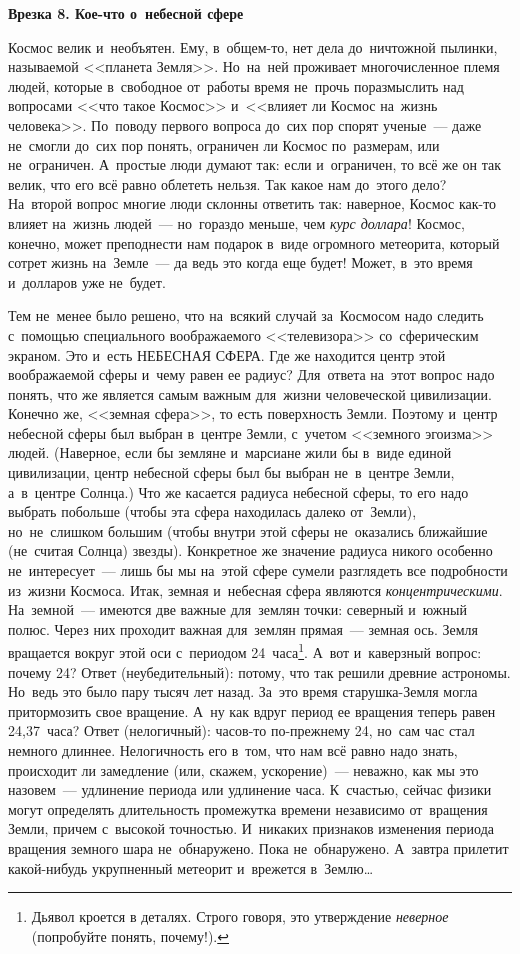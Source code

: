 \textbf{Врезка 8. Кое-что о~небесной сфере}

Космос велик и~необъятен. Ему, в~общем-то, нет дела до~ничтожной пылинки, называемой <<планета
Земля>>. Но~на~ней проживает многочисленное племя людей, которые в~свободное от~работы время
не~прочь поразмыслить над вопросами <<что такое Космос>> и~<<влияет ли Космос на~жизнь человека>>.
По~поводу первого вопроса до~сих пор спорят ученые~--- даже не~смогли до~сих пор понять, ограничен
ли Космос по~размерам, или не~ограничен. А~простые люди думают так: если и~ограничен, то всё же он
так велик, что его всё равно облететь нельзя. Так какое нам до~этого дело? На~второй вопрос многие
люди склонны ответить так: наверное, Космос как-то влияет на~жизнь людей~--- но~гораздо меньше, чем
\textit{курс доллара}! Космос, конечно, может преподнести нам подарок в~виде огромного метеорита, который
сотрет жизнь на~Земле~--- да ведь это когда еще будет! Может, в~это время и~долларов уже не~будет.

Тем не~менее было решено, что на~всякий случай за~Космосом надо следить с~помощью специального
воображаемого <<телевизора>> со~сферическим экраном. Это и~есть НЕБЕСНАЯ СФЕРА. Где же находится
центр этой воображаемой сферы и~чему равен ее радиус? Для~ответа на~этот вопрос надо понять, что же
является самым важным для~жизни человеческой цивилизации. Конечно же, <<земная сфера>>, то есть
поверхность Земли. Поэтому и~центр небесной сферы был выбран в~центре Земли, с~учетом <<земного
эгоизма>> людей. (Наверное, если бы земляне и~марсиане жили бы в~виде единой цивилизации, центр
небесной сферы был бы выбран не~в~центре Земли, а~в~центре Солнца.) Что же касается радиуса
небесной сферы, то его надо выбрать побольше (чтобы эта сфера находилась далеко от~Земли),
но~не~слишком большим (чтобы внутри этой сферы не~оказались ближайшие (не~считая Солнца) звезды).
Конкретное же значение радиуса никого особенно не~интересует~--- лишь бы мы на~этой сфере сумели
разглядеть все подробности из~жизни Космоса. Итак, земная и~небесная сфера являются
\textit{концентрическими}. На~земной~--- имеются две важные для~землян точки: северный и~южный полюс. Через
них проходит важная для~землян прямая~--- земная ось. Земля вращается вокруг этой оси с~периодом
24~часа\footnote{Дьявол кроется в деталях. Строго говоря, это утверждение {\em неверное} (попробуйте понять, почему!).}.
А~вот и~каверзный вопрос: почему 24? Ответ (неубедительный): потому, что так решили древние
астрономы. Но~ведь это было пару тысяч лет назад. За~это время старушка-Земля могла притормозить
свое вращение. А~ну как вдруг период ее вращения теперь равен 24,37~часа? Ответ (нелогичный):
часов-то по-прежнему 24, но~сам час стал немного длиннее. Нелогичность его в~том, что нам всё равно
надо знать, происходит ли замедление (или, скажем, ускорение)~--- неважно, как мы это назовем~---
удлинение периода или удлинение часа. К~счастью, сейчас физики могут определять длительность
промежутка времени независимо от~вращения Земли, причем с~высокой точностью. И~никаких признаков
изменения периода вращения земного шара не~обнаружено. Пока не~обнаружено. А~завтра прилетит
какой-нибудь укрупненный метеорит и~врежется в~Землю\ldots


